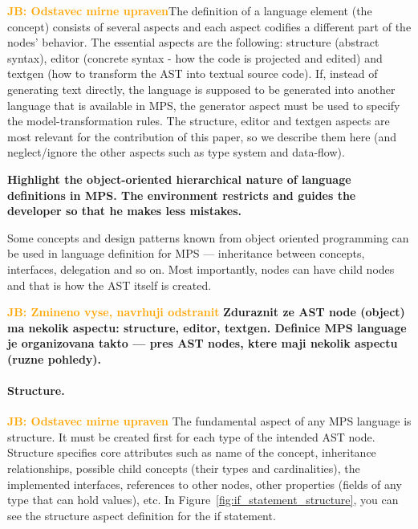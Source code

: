 \documentclass[10pt]{sigplanconf}
\newcommand{\todo}[1]{{\bfseries #1}}
\newcommand{\JB}[1]{\textcolor{orange}{\bfseries JB: #1}} %
\begin{document}
\JB{Odstavec mirne upraven}The definition of a language element (the concept) consists of several aspects and each aspect codifies a different part of the nodes' behavior. The essential aspects are the following: structure (abstract syntax), editor (concrete syntax - how the code is projected and edited) and textgen (how to transform the AST into textual source code). If, instead of generating text directly, the language is supposed to be generated into another language that is available in MPS, the generator aspect must be used to specify the model-transformation rules. The structure, editor and textgen aspects are most relevant for the contribution of this paper, so we describe them here (and neglect/ignore the other aspects such as type system and data-flow).

\todo{Highlight the object-oriented hierarchical nature of language definitions in MPS. The environment restricts and guides the developer so that he makes less mistakes.}

Some concepts and design patterns known from object oriented programming can be used in language definition for MPS --- inheritance between concepts, interfaces, delegation and so on. Most importantly, nodes can have child nodes and that is how the AST itself is created.

\JB{Zmineno vyse, navrhuji odstranit} \todo{Zduraznit ze AST node (object) ma nekolik aspectu: structure, editor, textgen. Definice MPS language je organizovana takto --- pres AST nodes, ktere maji nekolik aspectu (ruzne pohledy).}

\paragraph{Structure.}
\JB{Odstavec mirne upraven} The fundamental aspect of any MPS language is structure. It must be created first for each type of the intended AST node. Structure specifies core attributes such as name of the concept, inheritance relationships, possible child concepts (their types and cardinalities), the implemented interfaces, references to other nodes, other properties (fields of any type that can hold values), etc.
In Figure~\ref{fig:if_statement_structure}, you can see the structure aspect definition for the if statement.
\end{document}
